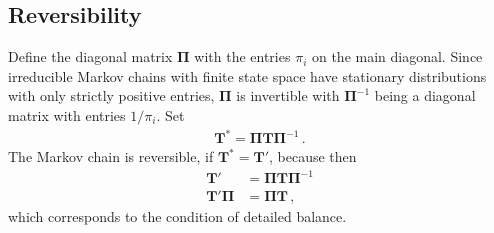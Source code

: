\documentclass[preprint]{elsarticle}
\newcommand\given{{\,|\,}}
\newcommand\ie{{\it i.e.,}}
\newcommand\x[1]{\ensuremath{x_{#1}}}
\begin{document}
\subsection{Reversibility}

Define the diagonal matrix $\mathbf{\Pi}$ with the entries $\pi_i$ on the main diagonal. Since irreducible Markov chains with finite state space have stationary distributions with only strictly positive entries, $\mathbf{\Pi}$ is invertible with $\mathbf{\Pi}^{-1}$ being a diagonal matrix with entries $1/\pi_i$.  Set
\begin{equation}\label{eq:reverse_transition}
\begin{split}
\mathbf{T}^{*}=\mathbf{\Pi}\mathbf{T}\mathbf{\Pi}^{-1}\,.
\end{split}
\end{equation}
The Markov chain is reversible, if $\mathbf{T}^{*}=\mathbf{T}'$, because then
\begin{equation}\label{eq:detailed_balance}
\begin{split}
  \mathbf{T}' &= \mathbf{\Pi}\mathbf{T}\mathbf{\Pi}^{-1}\\
  \mathbf{T}'\mathbf{\Pi} &= \mathbf{\Pi T}\,,
\end{split}
\end{equation}
which corresponds to the condition of detailed balance.
\end{document}
